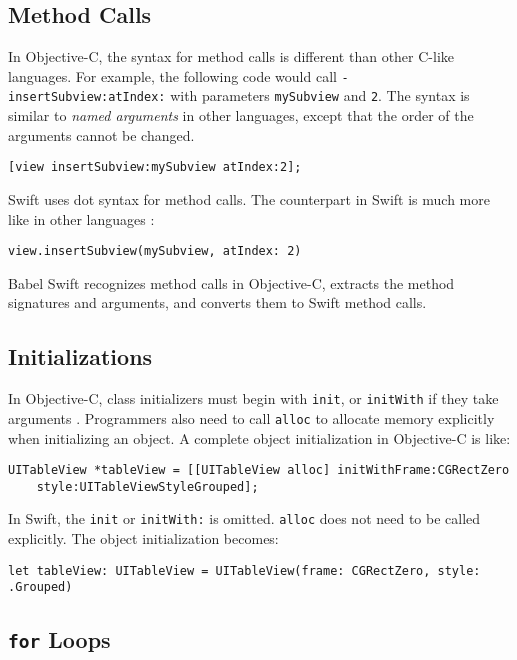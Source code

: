 \documentclass{sfuthesis}
\begin{document}
\subsection{Method Calls}

In Objective-C, the syntax for method calls is different than other C-like languages. For example, the following code would call \texttt{- insertSubview:atIndex:} with parameters \texttt{mySubview} and \texttt{2}. The syntax is similar to \emph{named arguments} in other languages, except that the order of the arguments cannot be changed.

\begin{verbatim}
[view insertSubview:mySubview atIndex:2];
\end{verbatim}

Swift uses dot syntax for method calls. The counterpart in Swift is much more like in other languages \cite{swiftobjcapis}:

\begin{verbatim}
view.insertSubview(mySubview, atIndex: 2)
\end{verbatim}

Babel Swift recognizes method calls in Objective-C, extracts the method signatures and arguments, and converts them to Swift method calls.

\subsection{Initializations}

In Objective-C, class initializers must begin with \texttt{init}, or \texttt{initWith} if they take arguments \cite{objcinit}. Programmers also need to call \texttt{alloc} to allocate memory explicitly when initializing an object. A complete object initialization in Objective-C is like:

\begin{verbatim}
UITableView *tableView = [[UITableView alloc] initWithFrame:CGRectZero
    style:UITableViewStyleGrouped];
\end{verbatim}

In Swift, the \texttt{init} or \texttt{initWith:} is omitted. \texttt{alloc} does not need to be called explicitly. The object initialization becomes:

\begin{verbatim}
let tableView: UITableView = UITableView(frame: CGRectZero, style: .Grouped)
\end{verbatim}

\subsection{\texttt{for} Loops}
\end{document}
